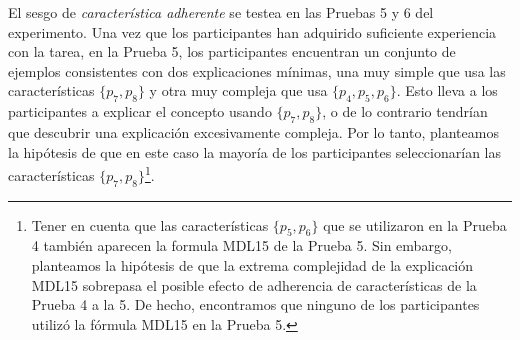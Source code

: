 \begin{hyp}\label{Hip:FeatureBiasStickiness}
El sesgo de \textit{característica adherente} se testea en las Pruebas 5 y 6 del experimento. Una vez que los participantes han adquirido suficiente experiencia con la tarea, en la Prueba 5, los participantes encuentran un conjunto de ejemplos consistentes con dos explicaciones mínimas, una muy simple que usa las características $\{p_7, p_8 \}$ y otra muy compleja que usa $\{p_4, p_5, p_6 \}$. Esto lleva a los participantes a explicar el concepto usando $\{p_7, p_8 \} $, o de lo contrario tendrían que descubrir una explicación excesivamente compleja. Por lo tanto, planteamos la hipótesis de que en este caso la mayoría de los participantes seleccionarían las características $\{p_7, p_8 \}$\footnote{Tener en cuenta que las características $\{p_5, p_6 \}$ que se utilizaron en la Prueba 4 también aparecen la formula MDL15 de la Prueba 5. Sin embargo, planteamos la hipótesis de que la extrema complejidad de la explicación MDL15 sobrepasa el posible efecto de adherencia de características de la Prueba 4 a la 5. De hecho, encontramos que ninguno de los participantes utilizó la fórmula MDL15 en la Prueba 5.}.
    

\end{hyp}
